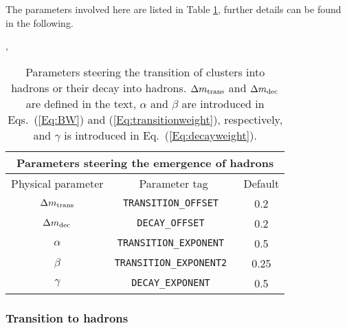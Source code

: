 \documentclass[a4paper,fleqn,10pt]{article}
\begin{document}
\begin{appendix}
The parameters involved here are listed in Table \ref{Tab:HadronEmergence},
further details can be found in the following.
\begin{table}[h!]
  \label{Tab:HadronEmergence},
  \begin{center}
    \begin{tabular}{|c||c|c|}
      \hline
      \multicolumn{3}{|c|}{Parameters steering the emergence of hadrons}\\
      \hline
      Physical parameter & Parameter tag & Default\\
      \hline
      \hline
      $\Delta m_{\rm trans}$ & {\tt TRANSITION\_OFFSET }    & 0.2 \\
      $\Delta m_{\rm dec}$   & {\tt DECAY\_OFFSET }         & 0.2 \\
      $\alpha$              & {\tt TRANSITION\_EXPONENT }  & 0.5 \\
      $\beta$               & {\tt TRANSITION\_EXPONENT2 } & 0.25 \\
      $\gamma$              & {\tt DECAY\_EXPONENT }       & 0.5 \\
      \hline
    \end{tabular}

    \parbox{12cm}{\caption{Parameters steering the transition of clusters into
        hadrons or their decay into hadrons.  $\Delta m_{\rm trans}$ and
        $\Delta m_{\rm dec}$ are defined in the text, $\alpha$ and $\beta$
        are introduced in Eqs.\ (\ref{Eq:BW}) and (\ref{Eq:transitionweight}), 
        respectively, and $\gamma$ is introduced in Eq.\ 
        (\ref{Eq:decayweight}).}}
  \end{center}
\end{table}

\subsubsection{Transition to hadrons}
\label{Sec::hadrontransitions}


\end{appendix}
\end{document}
